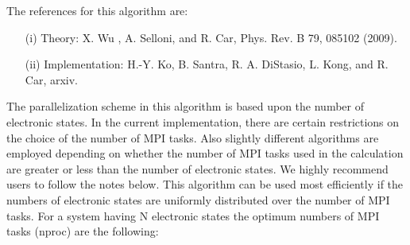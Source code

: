 \documentclass[12pt,a4paper]{article}
\begin{document}
The references for this algorithm are:
\begin{itemize}
  \item[(i)] Theory: X. Wu , A. Selloni, and R. Car, Phys. Rev. B 79, 085102 (2009).
  \item[(ii)] Implementation: H.-Y. Ko, B. Santra, R. A. DiStasio, L. Kong, and R. Car, arxiv.
\end{itemize}

The parallelization scheme in this algorithm is based upon the number of electronic states. 
In the current implementation, there are certain restrictions on the choice of the number of MPI tasks.
Also slightly different algorithms are employed depending on whether the number of MPI tasks used in the calculation are greater or less than the number of electronic states.
We highly recommend users to follow the notes below.
This algorithm can be used most efficiently if the numbers of electronic states are uniformly distributed over the number of MPI tasks. 
For a system having N electronic states the optimum numbers of MPI tasks (nproc) are the following:
\end{document}
